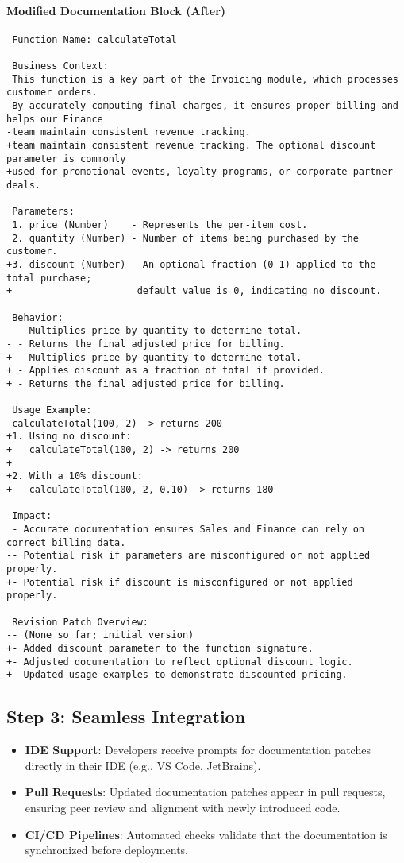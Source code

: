 \documentclass[12pt,oneside]{article}
\begin{document}
\paragraph{Modified Documentation Block (After)}
\begin{verbatim}
 Function Name: calculateTotal

 Business Context:
 This function is a key part of the Invoicing module, which processes customer orders.
 By accurately computing final charges, it ensures proper billing and helps our Finance
-team maintain consistent revenue tracking.
+team maintain consistent revenue tracking. The optional discount parameter is commonly
+used for promotional events, loyalty programs, or corporate partner deals.

 Parameters:
 1. price (Number)    - Represents the per-item cost.
 2. quantity (Number) - Number of items being purchased by the customer.
+3. discount (Number) - An optional fraction (0–1) applied to the total purchase;
+                      default value is 0, indicating no discount.

 Behavior:
- - Multiplies price by quantity to determine total.
- - Returns the final adjusted price for billing.
+ - Multiplies price by quantity to determine total.
+ - Applies discount as a fraction of total if provided.
+ - Returns the final adjusted price for billing.

 Usage Example:
-calculateTotal(100, 2) -> returns 200
+1. Using no discount:
+   calculateTotal(100, 2) -> returns 200
+
+2. With a 10% discount:
+   calculateTotal(100, 2, 0.10) -> returns 180

 Impact:
 - Accurate documentation ensures Sales and Finance can rely on correct billing data.
-- Potential risk if parameters are misconfigured or not applied properly.
+- Potential risk if discount is misconfigured or not applied properly.

 Revision Patch Overview:
-- (None so far; initial version)
+- Added discount parameter to the function signature.
+- Adjusted documentation to reflect optional discount logic.
+- Updated usage examples to demonstrate discounted pricing.
\end{verbatim}

\subsection{Step 3: Seamless Integration}
\begin{itemize}
  \item \textbf{IDE Support}: Developers receive prompts for documentation patches directly in their IDE (e.g., VS Code, JetBrains).
  \item \textbf{Pull Requests}: Updated documentation patches appear in pull requests, ensuring peer review and alignment with newly introduced code.
  \item \textbf{CI/CD Pipelines}: Automated checks validate that the documentation is synchronized before deployments.
\end{itemize}
\end{document}
